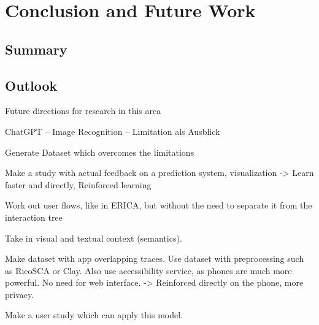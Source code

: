 \chapter{Conclusion and Future Work}
\label{sec:zusfas}

\section*{Summary}
\section*{Outlook}

Future directions for research in this area

ChatGPT – Image Recognition – Limitation als Ausblick

Generate Dataset which overcomes the limitations

Make a study with actual feedback on a prediction system, visualization
-> Learn faster and directly, Reinforced learning

Work out user flows, like in ERICA, but without the need to separate it from the interaction tree

Take in visual and textual context (semantics).

Make dataset with app overlapping traces.
Use dataset with preprocessing such as RicoSCA or Clay.
Also use accessibility service, as phones are much more powerful.
No need for web interface.
-> Reinforced directly on the phone, more privacy.

Make a user study which can apply this model.
